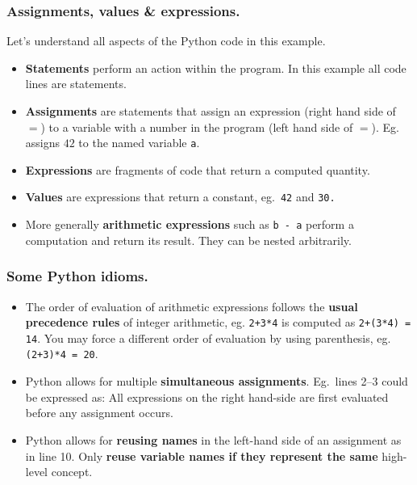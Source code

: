 \documentclass{beamer} %
\newcommand\emc[1]{\textcolor{midred}{\textbf{#1}}}
\begin{document}
\begin{frame}
\frametitle{Assignments, values \& expressions.}

Let's understand all aspects of the Python code in this example.
\begin{itemize}
\item \emc{Statements} perform an action within the program. In this example all code lines are statements.
\item \emc{Assignments} are statements that assign an expression (right hand side of $=$) to a variable with a number in the program (left hand side of $=$). Eg.\  assigns $42$ to the named variable \texttt{a}.
\item \emc{Expressions} are fragments of code that return a computed quantity.
\item \emc{Values} are expressions that return a constant, eg.\ \texttt{42} and \texttt{30.}
\item More generally \emc{arithmetic expressions} such as \texttt{b - a} perform a computation and return its result. They can be nested arbitrarily.
\end{itemize}

\end{frame}

\begin{frame}
\frametitle{Some Python idioms.}

\begin{itemize}
	\item The order of evaluation of arithmetic expressions follows the \emc{usual precedence rules} of integer arithmetic, eg. \texttt{2+3*4} is computed as \texttt{2+(3*4) = 14}. You may force a different order of evaluation by using parenthesis, eg. \texttt{(2+3)*4 = 20}.
	\item Python allows for multiple \emc{simultaneous assignments}. Eg.\ lines 2--3 could be expressed as:
	All expressions on the right hand-side are first evaluated before any assignment occurs.
	\item Python allows for \emc{reusing names} in the left-hand side of an assignment as in line 10.
	Only \emc{reuse variable names if they represent the same} high-level concept.

\end{itemize}

\end{frame}
\end{document}
